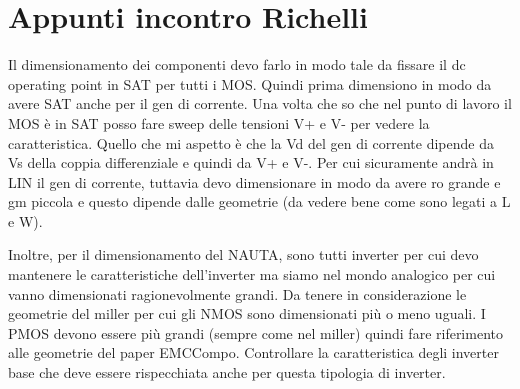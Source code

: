 \documentclass[a4paper]{article}
\begin{document}
    \section*{Appunti incontro Richelli}
    Il dimensionamento dei componenti devo farlo in modo tale da fissare il dc operating point in SAT per tutti i MOS.
    Quindi prima dimensiono in modo da avere SAT anche per il gen di corrente. Una volta che so che nel punto di lavoro il MOS è in SAT posso fare sweep delle tensioni V+ e V- per vedere la caratteristica.
    Quello che mi aspetto è che la Vd del gen di corrente dipende da Vs della coppia differenziale e quindi da V+ e V-. Per cui sicuramente andrà in LIN il gen di corrente, tuttavia devo dimensionare in modo da avere ro grande e gm piccola e questo dipende dalle geometrie (da vedere bene come sono legati a L e W).

    Inoltre, per il dimensionamento del NAUTA, sono tutti inverter per cui devo mantenere le caratteristiche dell'inverter ma siamo nel mondo analogico per cui vanno dimensionati ragionevolmente grandi. 
    Da tenere in considerazione le geometrie del miller per cui gli NMOS sono dimensionati più o meno uguali. I PMOS devono essere più grandi (sempre come nel miller) quindi fare riferimento alle geometrie del paper EMCCompo.
    Controllare la caratteristica degli inverter base che deve essere rispecchiata anche per questa tipologia di inverter. 
            
\end{document}
